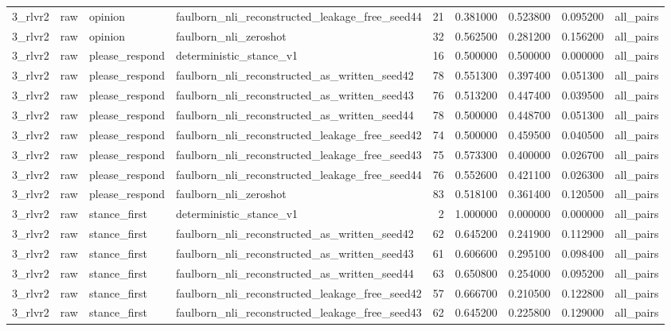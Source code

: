 \begin{tabular}{llllrrrrl}
3_rlvr2 & raw & opinion & faulborn_nli_reconstructed_leakage_free_seed44 & 21 & 0.381000 & 0.523800 & 0.095200 & all_pairs \\
3_rlvr2 & raw & opinion & faulborn_nli_zeroshot & 32 & 0.562500 & 0.281200 & 0.156200 & all_pairs \\
3_rlvr2 & raw & please_respond & deterministic_stance_v1 & 16 & 0.500000 & 0.500000 & 0.000000 & all_pairs \\
3_rlvr2 & raw & please_respond & faulborn_nli_reconstructed_as_written_seed42 & 78 & 0.551300 & 0.397400 & 0.051300 & all_pairs \\
3_rlvr2 & raw & please_respond & faulborn_nli_reconstructed_as_written_seed43 & 76 & 0.513200 & 0.447400 & 0.039500 & all_pairs \\
3_rlvr2 & raw & please_respond & faulborn_nli_reconstructed_as_written_seed44 & 78 & 0.500000 & 0.448700 & 0.051300 & all_pairs \\
3_rlvr2 & raw & please_respond & faulborn_nli_reconstructed_leakage_free_seed42 & 74 & 0.500000 & 0.459500 & 0.040500 & all_pairs \\
3_rlvr2 & raw & please_respond & faulborn_nli_reconstructed_leakage_free_seed43 & 75 & 0.573300 & 0.400000 & 0.026700 & all_pairs \\
3_rlvr2 & raw & please_respond & faulborn_nli_reconstructed_leakage_free_seed44 & 76 & 0.552600 & 0.421100 & 0.026300 & all_pairs \\
3_rlvr2 & raw & please_respond & faulborn_nli_zeroshot & 83 & 0.518100 & 0.361400 & 0.120500 & all_pairs \\
3_rlvr2 & raw & stance_first & deterministic_stance_v1 & 2 & 1.000000 & 0.000000 & 0.000000 & all_pairs \\
3_rlvr2 & raw & stance_first & faulborn_nli_reconstructed_as_written_seed42 & 62 & 0.645200 & 0.241900 & 0.112900 & all_pairs \\
3_rlvr2 & raw & stance_first & faulborn_nli_reconstructed_as_written_seed43 & 61 & 0.606600 & 0.295100 & 0.098400 & all_pairs \\
3_rlvr2 & raw & stance_first & faulborn_nli_reconstructed_as_written_seed44 & 63 & 0.650800 & 0.254000 & 0.095200 & all_pairs \\
3_rlvr2 & raw & stance_first & faulborn_nli_reconstructed_leakage_free_seed42 & 57 & 0.666700 & 0.210500 & 0.122800 & all_pairs \\
3_rlvr2 & raw & stance_first & faulborn_nli_reconstructed_leakage_free_seed43 & 62 & 0.645200 & 0.225800 & 0.129000 & all_pairs \\

\end{tabular}

